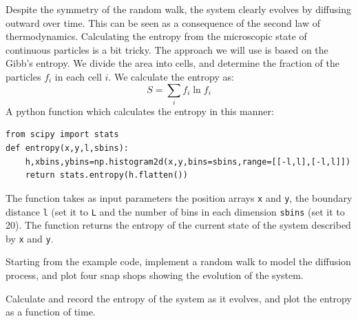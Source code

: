Despite the symmetry of the random walk, the system clearly evolves by
diffusing outward over time.  This can be seen as a consequence of the
second law of thermodynamics.  Calculating the entropy from the
microscopic state of continuous particles is a bit tricky.  The
approach we will use is based on the Gibb's entropy.  We divide the
area into cells, and determine the fraction of the particles $f_i$ in
each cell $i$.  We calculate the entropy as:
\begin{displaymath}
  S = \sum_i f_i \ln f_i
\end{displaymath}
A python function which calculates the entropy in this manner:
\begin{tt}
\begin{verbatim}
from scipy import stats  
def entropy(x,y,l,sbins):
    h,xbins,ybins=np.histogram2d(x,y,bins=sbins,range=[[-l,l],[-l,l]])
    return stats.entropy(h.flatten())
\end{verbatim}
\end{tt}
The function takes as input parameters the position arrays {\tt x} and
{\tt y}, the boundary distance {\tt l} (set it to {\tt L} and the
number of bins in each dimension {\tt sbins} (set it to 20).  The
function returns the entropy of the current state of the system
described by {\tt x} and {\tt y}.

\begin{plot} \end{plot}
Starting from the example code, implement a random walk to model the
diffusion process, and plot four snap shops showing the evolution of
the system.

\begin{plot} \end{plot}
Calculate and record the entropy of the system as it evolves, and plot
the entropy as a function of time.

